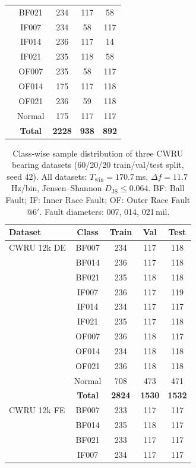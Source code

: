 \documentclass[journal]{IEEEtran}
\begin{document}
\begin{table}[!t]
\begin{tabular}{lcccc}
& BF021  & 234 & 117 & 58  \\
& IF007  & 234 & 58  & 117 \\
& IF014  & 236 & 117 & 14  \\
& IF021  & 235 & 118 & 58  \\
& OF007  & 235 & 58  & 117 \\
& OF014  & 175 & 117 & 118 \\
& OF021  & 236 & 59  & 118 \\
& Normal & 175 & 117 & 117 \\
& \textbf{Total} & \textbf{2228} & \textbf{938}  & \textbf{892}  \\
\bottomrule
\end{tabular}
\end{table}


\begin{table}[!t]
\centering
\caption{Class-wise sample distribution of three CWRU bearing datasets (60/20/20 train/val/test split, seed 42). All datasets: $T_{\text{win}}=170.7$\,ms, $\Delta f=11.7$\,Hz/bin, Jensen--Shannon $D_{\text{JS}} \leq 0.064$. BF: Ball Fault; IF: Inner Race Fault; OF: Outer Race Fault @6$'$. Fault diameters: 007, 014, 021\,mil.}
\label{tab:datasets_comprehensive}
\small
\renewcommand{\arraystretch}{1.0}
\setlength{\tabcolsep}{5pt}
\begin{tabular}{lcccc}
\toprule
\textbf{Dataset} & \textbf{Class} & \textbf{Train} & \textbf{Val} & \textbf{Test} \\
\midrule
CWRU 12k DE & BF007  & 234 & 117 & 118 \\
 & BF014  & 236 & 117 & 118 \\
 & BF021  & 235 & 118 & 118 \\
 & IF007  & 236 & 117 & 119 \\
 & IF014  & 234 & 117 & 117 \\
 & IF021  & 235 & 117 & 118 \\
 & OF007  & 236 & 118 & 117 \\
 & OF014  & 234 & 118 & 118 \\
 & OF021  & 236 & 118 & 118 \\
 & Normal & 708 & 473 & 471 \\
 & \textbf{Total} & \textbf{2824} & \textbf{1530} & \textbf{1532} \\
\midrule
CWRU 12k FE & BF007  & 233 & 117 & 117 \\
 & BF014  & 235 & 118 & 117 \\
 & BF021  & 233 & 117 & 117 \\
 & IF007  & 234 & 117 & 117 \\

\end{tabular}
\end{table}
\end{document}
